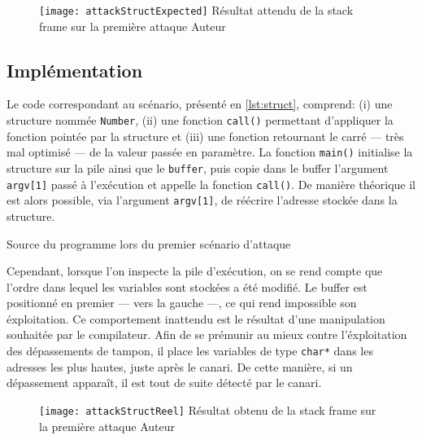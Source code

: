 \begin{figure}[H]
	\centering
	\texttt{[image: attackStructExpected]}
	{Résultat attendu de la \og stack frame \fg sur la première attaque}
	{Auteur}
	\label{fig:attackStructExpected}
\end{figure}

\subsection{Implémentation}

Le code correspondant au scénario, présenté en \autoref{lst:struct}, comprend: (i) une structure nommée \texttt{Number}, (ii) une fonction \texttt{call()} permettant d'appliquer la fonction pointée par la structure et (iii) une fonction retournant le carré --- très mal optimisé --- de la valeur passée en paramètre. La fonction \texttt{main()} initialise la structure sur la pile ainsi que le \texttt{buffer}, puis copie dans le buffer l'argument \texttt{argv[1]} passé à l'exécution et appelle la fonction \texttt{call()}. De manière théorique il est alors possible, via l'argument \texttt{argv[1]}, de réécrire l'adresse stockée dans la structure.

\begin{listing}
	\caption{Source du programme lors du premier scénario d'attaque}
	\label{lst:struct}
\end{listing}

Cependant, lorsque l'on inspecte la pile d'exécution, on se rend compte que l'ordre dans lequel les variables sont stockées a été modifié. Le \og buffer \fg est positionné en premier --- vers la gauche ---, ce qui rend impossible son éxploitation. Ce comportement inattendu est le résultat d'une manipulation souhaitée par le compilateur. Afin de se prémunir au mieux contre l'éxploitation des dépassements de tampon, il place les variables de type \texttt{char*} dans les adresses les plus hautes, juste après le canari. De cette manière, si un dépassement apparaît, il est tout de suite détecté par le canari.

\begin{figure}[H]
	\centering
	\texttt{[image: attackStructReel]}
	{Résultat obtenu de la \og stack frame \fg sur la première attaque}
	{Auteur}
	\label{fig:attackStructReel}
\end{figure}

